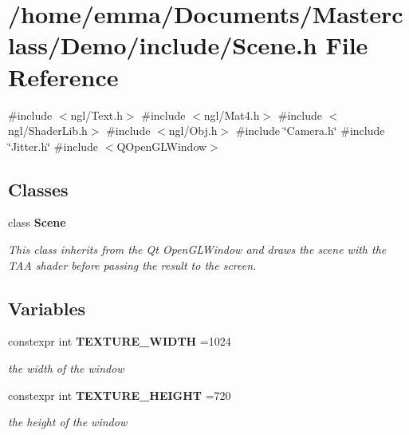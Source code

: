 \section{/home/emma/\+Documents/\+Masterclass/\+Demo/include/\+Scene.h File Reference}
\label{_scene_8h}
{\ttfamily \#include $<$ngl/\+Text.\+h$>$}\newline
{\ttfamily \#include $<$ngl/\+Mat4.\+h$>$}\newline
{\ttfamily \#include $<$ngl/\+Shader\+Lib.\+h$>$}\newline
{\ttfamily \#include $<$ngl/\+Obj.\+h$>$}\newline
{\ttfamily \#include \char`\"{}Camera.\+h\char`\"{}}\newline
{\ttfamily \#include \char`\"{}Jitter.\+h\char`\"{}}\newline
{\ttfamily \#include $<$Q\+Open\+G\+L\+Window$>$}\newline
\subsection*{Classes}
\begin{DoxyCompactItemize}
\item 
class \textbf{ Scene}
\begin{DoxyCompactList}\small\item\em This class inherits from the Qt Open\+G\+L\+Window and draws the scene with the T\+AA shader before passing the result to the screen. \end{DoxyCompactList}\end{DoxyCompactItemize}
\subsection*{Variables}
\begin{DoxyCompactItemize}
\item 
constexpr int \textbf{ T\+E\+X\+T\+U\+R\+E\+\_\+\+W\+I\+D\+TH} =1024
\begin{DoxyCompactList}\small\item\em the width of the window \end{DoxyCompactList}\item 
constexpr int \textbf{ T\+E\+X\+T\+U\+R\+E\+\_\+\+H\+E\+I\+G\+HT} =720
\begin{DoxyCompactList}\small\item\em the height of the window \end{DoxyCompactList}\end{DoxyCompactItemize}


